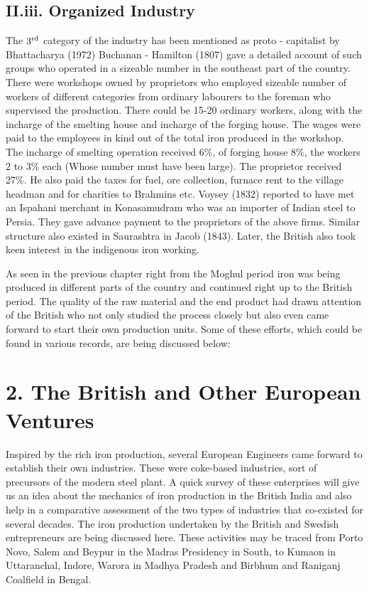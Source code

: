 \subsection*{II.iii. Organized Industry}\label{subsection-3}

The $3^{\rm rd}$ category of the industry has been mentioned as proto - capitalist by Bhattacharya (1972) Buchanan - Hamilton (1807) gave a detailed account of such groups who operated in a sizeable number in the southeast part of the country.  There were workshops owned by proprietors who employed sizeable number of workers of different categories from ordinary labourers to the foreman who supervised the production. There could be 15-20 ordinary workers, along with the incharge of the smelting house and incharge of the forging house.  The wages were paid to the employees in kind out of the total iron produced in the workshop.  The incharge of smelting operation received 6\%, of forging house 8\%, the workers 2 to 3\% each (Whose number must have been large).  The proprietor received 27\%.  He also paid the taxes for fuel, ore collection, furnace rent to the village headman and for charities to Brahmins etc. Voysey (1832) reported to have met an Ispahani merchant in Konasamudram who was an importer of Indian steel to Persia.  They gave advance payment to the proprietors of the above firms.  Similar structure also existed in Saurashtra in Jacob (1843). Later, the British also took keen interest in the indigenous iron working.  

As seen in the previous chapter right from the Moghul period iron was being produced in different parts of the country and continued right up to the British period. The quality of the raw material and the end product had drawn attention of the British who not only studied the process closely but also even came forward to start their own production units. Some of these efforts, which could be found in various records, are being discussed below:

\section*{2.  The British and Other European Ventures}

Inspired by the rich iron production, several European Engineers came forward to establish their own industries. These were coke-based industries, sort of precursors of the modern steel plant. A quick survey of these enterprises will give us an idea about the mechanics of iron production in the British India and also help in a comparative assessment of the two types of industries that co-existed for several decades. The iron production undertaken by the British and Swedish entrepreneurs are being discussed here. These activities may be traced from Porto Novo, Salem and Beypur in the Madras Presidency in South, to Kumaon in Uttaranchal, Indore, Warora in Madhya Pradesh and Birbhum and Raniganj Coalfield in Bengal.


